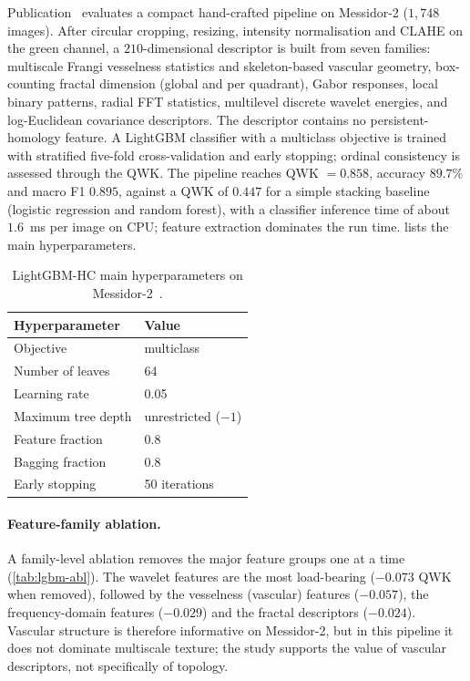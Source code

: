 Publication~\cite{belhadj2026icpram} evaluates a compact hand-crafted pipeline on
Messidor-2 ($1{,}748$ images). After circular cropping, resizing, intensity
normalisation and CLAHE on the green channel, a $210$-dimensional descriptor is built from
seven families: multiscale Frangi vesselness statistics and skeleton-based vascular
geometry, box-counting fractal dimension (global and per quadrant), Gabor responses, local
binary patterns, radial FFT statistics, multilevel discrete wavelet energies, and
log-Euclidean covariance descriptors. The descriptor contains no persistent-homology
feature. A LightGBM classifier with a multiclass objective is trained with stratified
five-fold cross-validation and early stopping; ordinal consistency is assessed through the
QWK. The pipeline reaches QWK $=0.858$, accuracy $89.7\%$ and macro F1 $0.895$, against a
QWK of $0.447$ for a simple stacking baseline (logistic regression and random forest), with
a classifier inference time of about $1.6$~ms per image on CPU; feature extraction
dominates the run time.  lists the main hyperparameters.

\begin{table}[!htbp]
\centering
\caption[LightGBM-HC hyperparameters]{LightGBM-HC main hyperparameters on
Messidor-2~\cite{belhadj2026icpram}.}
\label{tab:lgbm-hp}
\small
\begin{tabular}{@{}ll@{}}
\toprule
Hyperparameter & Value \\
\midrule
Objective & multiclass \\
Number of leaves & 64 \\
Learning rate & 0.05 \\
Maximum tree depth & unrestricted ($-1$) \\
Feature fraction & 0.8 \\
Bagging fraction & 0.8 \\
Early stopping & 50 iterations \\
\bottomrule
\end{tabular}
\end{table}

\paragraph{Feature-family ablation.}
A family-level ablation removes the major feature groups one at a time
(\cref{tab:lgbm-abl}). The wavelet features are the most load-bearing ($-0.073$ QWK when
removed), followed by the vesselness (vascular) features ($-0.057$), the frequency-domain
features ($-0.029$) and the fractal descriptors ($-0.024$). Vascular structure is therefore
informative on Messidor-2, but in this pipeline it does not dominate multiscale texture;
the study supports the value of vascular descriptors, not specifically of topology.

